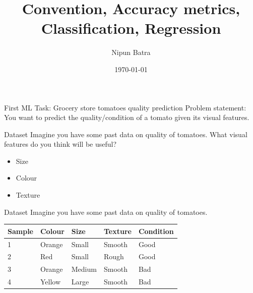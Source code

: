 \documentclass[usenames,dvipsnames]{beamer}
\title{Convention, Accuracy metrics, Classification, Regression}
\date{\today}
\author{Nipun Batra}
\institute{IIT Gandhinagar}
\begin{document}
  \maketitle
  
  
  



\begin{frame}{First ML Task: Grocery store tomatoes quality prediction}
Problem statement: You want to predict the quality/condition of a tomato given its visual features.
\end{frame}

\begin{frame}{Dataset}
Imagine you have some past data on quality of tomatoes. What visual features do you think will be useful?

\begin{itemize}
	\item \pause Size
	\item \pause Colour
	\item \pause Texture
\end{itemize}
\end{frame}
  
\begin{frame}{Dataset}
Imagine you have some past data on quality of tomatoes. 

\begin{table}[]
	\begin{tabular}{|l|l|l|l||l|}
		\hline 
		\textbf{Sample} & \textbf{Colour} & \textbf{Size} & \textbf{Texture} & \textbf{Condition} \\ \hline 
		1      & Orange & Small & Smooth  & Good      \\
		2      & Red    & Small  & Rough  & Good \\
		3      & Orange & Medium & Smooth & Bad \\
		4      & Yellow & Large  & Smooth & Bad \\ \hline          
	\end{tabular}
\end{table}
\end{frame}
\end{document}
